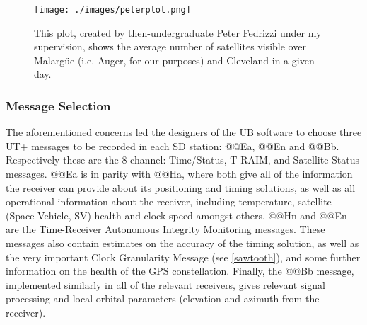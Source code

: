 \begin{figure}[h!]
\centering
\texttt{[image: ./images/peterplot.png]}
\caption[Simulated GPS Coverage over Auger and Cleveland]{This plot, created by then-undergraduate Peter Fedrizzi under my supervision, shows the average number of satellites visible over Malarg\"{u}e (i.e. Auger, for our purposes) and Cleveland in a given day.}
\label{peterplot}
\end{figure}
\subsubsection{Message Selection}
\label{messelect}
The aforementioned concerns led the designers of the UB software to choose three UT+ messages to be recorded in each SD station: @@Ea, @@En and @@Bb. Respectively these are the 8-channel: Time/Status, T-RAIM, and Satellite Status messages. @@Ea is in parity with @@Ha, where both give all of the information the receiver can provide about its positioning and timing solutions, as well as all operational information about the receiver, including temperature, satellite (Space Vehicle, SV) health and clock speed amongst others.  @@Hn and @@En are the Time-Receiver Autonomous Integrity Monitoring messages. These messages also contain estimates on the accuracy of the timing solution, as well as the very important Clock Granularity Message (see \autoref{sawtooth}), and some further information on the health of the GPS constellation. Finally, the @@Bb message, implemented similarly in all of the relevant receivers, gives relevant signal processing and local orbital parameters (elevation and azimuth from the receiver). 

